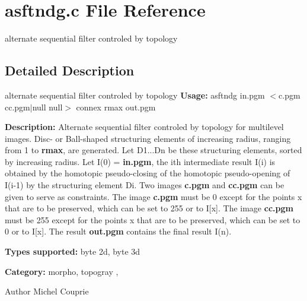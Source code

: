 \section{asftndg.c File Reference}
\label{asftndg_8c}


alternate sequential filter controled by topology  




\subsection{Detailed Description}
alternate sequential filter controled by topology {\bfseries Usage:} asftndg in.pgm $<$c.pgm cc.pgm$|$null null$>$ connex rmax out.pgm

{\bfseries Description:} Alternate sequential filter controled by topology for multilevel images. Disc-\/ or Ball-\/shaped structuring elements of increasing radius, ranging from 1 to {\bfseries rmax}, are generated. Let D1...Dn be these structuring elements, sorted by increasing radius. Let I(0) = {\bfseries in.pgm}, the ith intermediate result I(i) is obtained by the homotopic pseudo-\/closing of the homotopic pseudo-\/opening of I(i-\/1) by the structuring element Di. Two images {\bfseries c.pgm} and {\bfseries cc.pgm} can be given to serve as constraints. The image {\bfseries c.pgm} must be 0 except for the points x that are to be preserved, which can be set to 255 or to I[x]. The image {\bfseries cc.pgm} must be 255 except for the points x that are to be preserved, which can be set to 0 or to I[x]. The result {\bfseries out.pgm} contains the final result I(n).

{\bfseries Types supported:} byte 2d, byte 3d

{\bfseries Category:} morpho, topogray ,

\begin{DoxyAuthor}{Author}
Michel Couprie 
\end{DoxyAuthor}
